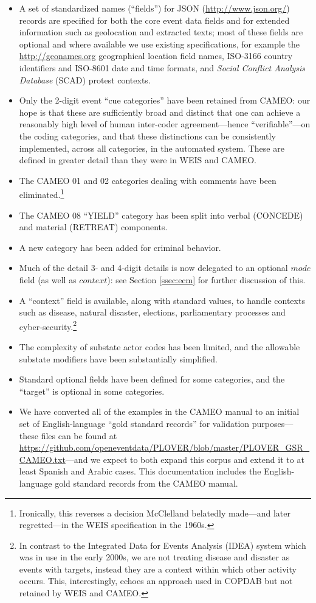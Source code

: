 \documentclass[11pt]{report}
\newcommand{\plcat}[1]{\textsf{#1}}
\newcommand{\fn}[1]{\footnote{#1}}
\begin{document}
\begin{itemize}
\item A set of standardized names (``fields'') for JSON (\url{http://www.json.org/}) records are specified for both the core event data fields and for extended information such as geolocation and extracted texts; most of these fields are optional and where available we use existing specifications, for example the \url{http://geonames.org} geographical location field names, ISO-3166 country identifiers and ISO-8601 date and time formats, and \textit{Social Conflict Analysis Database} (SCAD) protest contexts.
\item Only the 2-digit event ``cue categories'' have been retained from CAMEO: our hope is that these are sufficiently broad and distinct that one can achieve a reasonably high level of human inter-coder agreement---hence ``verifiable''---on the coding categories, and that these distinctions can be consistently implemented, across all categories, in the automated system. These are defined in greater detail than they were in WEIS and CAMEO.
\item The CAMEO 01 and 02 categories dealing with comments have been eliminated.\fn{Ironically, this reverses a decision McClelland belatedly made---and later regretted---in the WEIS specification in the 1960s.}
\item The CAMEO 08 ``YIELD'' category has been split into verbal (\plcat{CONCEDE}) and material (\plcat{RETREAT}) components. 
\item A new category has been added for criminal behavior.
\item Much of the detail 3- and 4-digit details is now delegated to an optional $mode$ field (as well as $context$): see Section \ref{ssec:ecm} for further discussion of this.  \item A ``context'' field is available, along with standard values, to handle contexts such as disease, natural disaster, elections, parliamentary processes and cyber-security.\fn{In contrast to the Integrated Data for Events Analysis (IDEA) \cite{BBOJT03} system which was in use in the early 2000s, we are not treating disease and disaster as events with targets, instead they are a context within which other activity occurs. This, interestingly, echoes an approach used in COPDAB but not retained by WEIS and CAMEO.}
\item The complexity of substate actor codes has been limited, and the allowable substate modifiers have been substantially simplified. 
\item Standard optional fields have been defined for some categories, and the ``target'' is optional in some categories.
\item We have converted all of the examples in the CAMEO manual to an initial set of English-language ``gold standard records'' for validation purposes---these files can be found at\\ \url{https://github.com/openeventdata/PLOVER/blob/master/PLOVER_GSR_CAMEO.txt}---and we expect to both expand this corpus and extend it to  at least Spanish and Arabic cases. This documentation includes the English-language gold standard records from the CAMEO manual.
\end{itemize}
\end{document}
